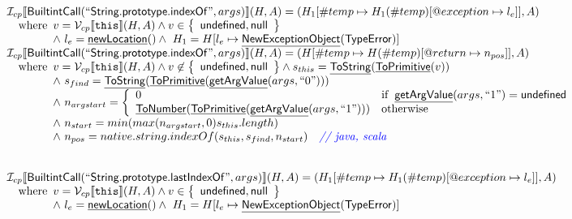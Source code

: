 \documentclass{article}
\makeatletter
\newcommand{\SF}[1]{\mbox{\textsf{#1}}}
\newcommand{\TT}[1]{\mbox{\texttt{#1}}}
\newcommand{\comment}[1]{\textit{#1}}
\newcommand{\wherec}[1]{{\rm where}\begin{array}[t]{l}#1\end{array}}
\newcommand{\ifc}[1]{{\rm if}\begin{array}[t]{l}#1\end{array}}
\newcommand{\owc}{{\rm otherwise}}
\newcommand{\I}{\mathcal{I}}
\newcommand{\V}{\mathcal{V}}
\newcommand{\set}[1]{\left\{\begin{array}{l}#1\end{array}\right\}}
\newcommand{\lbr}{\llbracket}
\newcommand{\rbr}{\rrbracket}
\newcommand{\hf}[1]{\underline{\sf #1}}
\newcommand{\varloc}[1]{\##1}
\newcommand{\varprop}[1]{@#1}
\def\inblue{\color{blue}}
\def\inblue{\color{blue}}
\makeatother
\begin{document}
\[
\begin{array}{l}
\I _{cp}\lbr \SF{BuiltintCall}(``\SF{String.prototype.indexOf}",args)\rbr(H,A)
 = (H_1[\varloc{temp}\mapsto H_1(\varloc{temp})[\varprop{exception}\mapsto l_e]], A) \\
\quad\wherec{
  v = \V _{cp}\lbr \TT{this}\rbr (H,A) \land v \in \set{\SF{undefined}, \SF{null}}\\
  \land\ l_e = \hf{newLocation}() \land\ H_1=H[l_e\mapsto\hf{NewExceptionObject}(\SF{TypeError})] 
  }\\
  
\I _{cp}\lbr \SF{BuiltintCall}(``\SF{String.prototype.indexOf}",args)\rbr(H,A)
 = (H[\varloc{temp}\mapsto H(\varloc{temp})[\varprop{return}\mapsto n_{pos}]], A) \\
\quad\wherec{
  v = \V _{cp}\lbr \TT{this}\rbr (H,A) \land v \not\in \set{\SF{undefined}, \SF{null}}
  \land s_{this} = \hf{ToString}(\hf{ToPrimitive}(v))\\
  \land\ s_{find} = \hf{ToString}(\hf{ToPrimitive}(\hf{getArgValue}(args, ``0")))\\
  \land\ n_{argstart} = \left\{\begin{array}{ll}
      0 & \ifc{\hf{getArgValue}(args, ``1") = \SF{undefined}}\\
      \hf{ToNumber}(\hf{ToPrimitive}(\hf{getArgValue}(args, ``1"))) & \owc\\
    \end{array}\right.\\
  \land\ n_{start} = min(max(n_{argstart}, 0) s_{this}.length)\\
  \land\ n_{pos} = native.string.indexOf(s_{this}, s_{find}, n_{start}) \quad\comment{{\inblue // java, scala}}\\
  }\\
\\\\


\I _{cp}\lbr \SF{BuiltintCall}(``\SF{String.prototype.lastIndexOf}",args)\rbr(H,A)
 = (H_1[\varloc{temp}\mapsto H_1(\varloc{temp})[\varprop{exception}\mapsto l_e]], A) \\
\quad\wherec{
  v = \V _{cp}\lbr \TT{this}\rbr (H,A) \land v \in \set{\SF{undefined}, \SF{null}}\\
  \land\ l_e = \hf{newLocation}() \land\ H_1=H[l_e\mapsto\hf{NewExceptionObject}(\SF{TypeError})] 
  }\\
  

\end{array}\]
\end{document}
